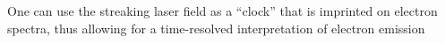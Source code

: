 




One can use the streaking laser field as a ``clock'' that is imprinted on electron spectra, thus allowing for a time-resolved interpretation of electron emission \cite{KellerNonadiabatic2013}

